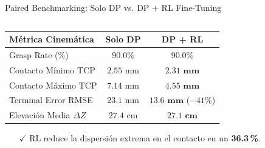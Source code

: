 \begin{frame}{Paired Benchmarking: Solo DP vs. DP + RL Fine-Tuning}
\begin{columns}[T, onlytextwidth]
    \begin{column}{0.45\textwidth}
      \begin{tcolorbox}[
        enhanced,
        colback=WhiteBg,
        colframe=AgriGreen,
        arc=\CardArc,
        boxrule=\CardRule,
        height=\CardHeightDouble,
        title={\CardTitleFont Resumen Cuantitativo Pareado ($N=10$)},
        colbacktitle=AgriGreen,
        coltitle=WhiteBg,
        top=1.2mm, bottom=1.2mm, left=1.8mm, right=1.8mm
      ]
        {\BodyFont
        \begin{tabular}{lcc}
          \toprule
          \textbf{Métrica Cinemática} & \textbf{Solo DP} & \textbf{DP + RL} \\
          \midrule
          Grasp Rate (\%) & $90.0\%$ & $\mathbf{90.0\%}$ \\
          Contacto Mínimo TCP & $2.55\text{ mm}$ & $\mathbf{2.31\text{ mm}}$ \\
          Contacto Máximo TCP & $7.14\text{ mm}$ & $\mathbf{4.55\text{ mm}}$ \\
          Terminal Error RMSE & $23.1\text{ mm}$ & $\mathbf{13.6\text{ mm}}$ ($-41\%$) \\
          Elevación Media $\Delta Z$ & $27.4\text{ cm}$ & $\mathbf{27.1\text{ cm}}$ \\
          \bottomrule
        \end{tabular}
        \vspace{0.8mm}
        \begin{itemize}\setlength{\itemsep}{1pt}
          \item[\textcolor{AgriGreen}{\textbf{$\checkmark$}}] RL reduce la dispersión extrema en el contacto en un \textbf{36.3\,\%}.
        \end{itemize}}
      \end{tcolorbox}
    \end{column}
  \end{columns}
\end{frame}


